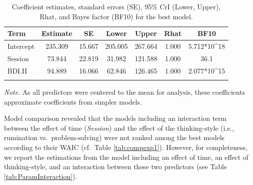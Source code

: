 \documentclass[a4paper,12pt,twoside,openright,oldfontcommands]{memoir}
\begin{document}
\begin{table}[H]
\begin{center}
\begin{threeparttable}
\caption{\label{tab:paramexp1}Coefficient estimates, standard errors (SE), 95\% CrI (Lower, Upper), Rhat, and Bayes factor (BF10) for the best model.}
\small{
\begin{tabular}{lcccccc}
\toprule
Term & \multicolumn{1}{c}{Estimate} & \multicolumn{1}{c}{SE} & \multicolumn{1}{c}{Lower} & \multicolumn{1}{c}{Upper} & \multicolumn{1}{c}{Rhat} & \multicolumn{1}{c}{BF10}\\
\midrule
Intercept & 235.309 & 15.667 & 205.005 & 267.664 & 1.000 & 5.712*10\textasciicircum{}18\\
Session & 73.844 & 22.819 & 31.982 & 121.588 & 1.000 & 36.1\\
BDI.II & 94.889 & 16.066 & 62.846 & 126.465 & 1.000 & 2.077*10\textasciicircum{}15\\
\bottomrule
\addlinespace
\end{tabular}
}
\begin{tablenotes}[para]
\textit{Note.} As all predictors were centered to the mean for analysis, these coefficients approximate coefficients from simpler models.
\end{tablenotes}
\end{threeparttable}
\end{center}
\end{table}

Model comparison revealed that the models including an interaction term between the effect of time (\emph{Session}) and the effect of the thinking-style (i.e., rumination vs.~problem-solving) were not ranked among the best models according to their WAIC (cf.~Table \ref{tab:compexp1}). However, for completeness, we report the estimations from the model including an effect of time, an effect of thinking-style, and an interaction between these two predictors (see Table \ref{tab:ParamInteraction}).
\end{document}
